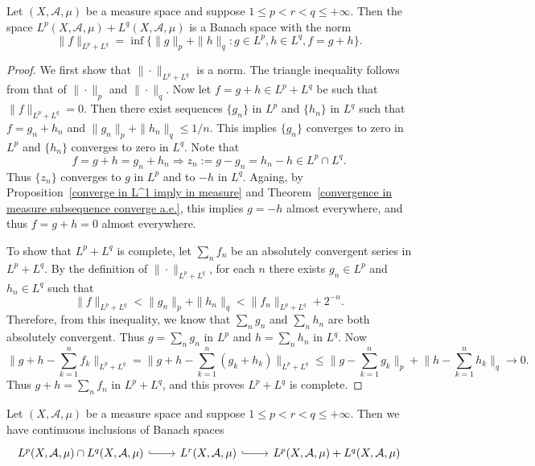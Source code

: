 \begin{proposition}\label{L^p space sum and intersection}
Let $(X,\mathcal{A},\mu)$ be a measure space and suppose $1\leq p<r<q\leq+\infty$. Then the space $L^p(X,\mathcal{A},\mu)+L^q(X,\mathcal{A},\mu)$ is a Banach space with the norm
\[\|f\|_{L^p+L^q}=\inf\{\|g\|_p+\|h\|_q:g\in L^p,h\in L^q,f=g+h\}.\]
\end{proposition}
\begin{proof}
We first show that $\|\cdot\|_{L^p+L^q}$ is a norm. The triangle inequality follows from that of $\|\cdot\|_p$ and $\|\cdot\|_q$. Now let $f=g+h\in L^p+L^q$ be such that $\|f\|_{L^p+L^q}=0$. Then there exist sequences $\{g_n\}$ in $L^p$ and $\{h_n\}$ in $L^q$ such that $f=g_n+h_n$ and $\|g_n\|_p+\|h_n\|_q\leq 1/n$. This implies $\{g_n\}$ converges to zero in $L^p$ and $\{h_n\}$ converges to zero in $L^q$. Note that
\[f=g+h=g_n+h_n\Longrightarrow z_n:=g-g_n=h_n-h\in L^p\cap L^q.\]
Thus $\{z_n\}$ converges to $g$ in $L^p$ and to $-h$ in $L^q$. Againg, by Proposition~\ref{converge in L^1 imply in measure} and Theorem~\ref{convergence in measure subsequence converge a.e.}, this implies $g=-h$ almost everywhere, and thus $f=g+h=0$ almost everywhere.\par
To show that $L^p+L^q$ is complete, let $\sum_nf_n$ be an absolutely convergent series in $L^p+L^q$. By the definition of $\|\cdot\|_{L^p+L^q}$, for each $n$ there exists $g_n\in L^p$ and $h_n\in L^q$ such that
\[\|f\|_{L^p+L^q}<\|g_n\|_p+\|h_n\|_q<\|f_n\|_{L^p+L^q}+2^{-n}.\]
Therefore, from this inequality, we know that $\sum_ng_n$ and $\sum_nh_n$ are both absolutely convergent. Thus $g=\sum_ng_n$ in $L^p$ and $h=\sum_nh_n$ in $L^q$. Now
\[\Big\|g+h-\sum_{k=1}^{n}f_k\Big\|_{L^p+L^q}=\Big\|g+h-\sum_{k=1}^{n}(g_k+h_k)\Big\|_{L^p+L^q}\leq\Big\|g-\sum_{k=1}^{n}g_k\Big\|_{p}+\Big\|h-\sum_{k=1}^{n}h_k\Big\|_q\to 0.\]
Thus $g+h=\sum_nf_n$ in $L^p+L^q$, and this proves $L^p+L^q$ is complete.
\end{proof}
\begin{proposition}
Let $(X,\mathcal{A},\mu)$ be a measure space and suppose $1\leq p<r<q\leq+\infty$. Then we have continuous inclusions of Banach spaces
\[
\begin{tikzcd}
L^p(X,\mathcal{A},\mu)\cap L^q(X,\mathcal{A},\mu)\ar[r,hook]&L^r(X,\mathcal{A},\mu)\ar[r,hook]&L^p(X,\mathcal{A},\mu)+L^q(X,\mathcal{A},\mu)
\end{tikzcd}
\]
\end{proposition}
